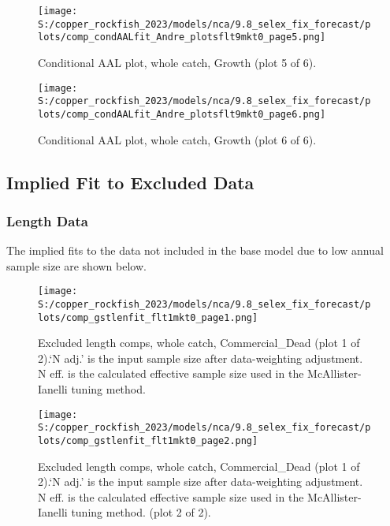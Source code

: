 \documentclass[11pt,
  english,
  letterpaper,
]{article}
\begin{document}
\begin{figure}
\centering
\texttt{[image: S:/copper\_rockfish\_2023/models/nca/9.8\_selex\_fix\_forecast/plots/comp\_condAALfit\_Andre\_plotsflt9mkt0\_page5.png]}
\caption{Conditional AAL plot, whole catch, Growth (plot 5 of 6).\label{fig:comp_condAALfit_Andre_plotsflt9mkt0_page5}}
\end{figure}

\begin{figure}
\centering
\texttt{[image: S:/copper\_rockfish\_2023/models/nca/9.8\_selex\_fix\_forecast/plots/comp\_condAALfit\_Andre\_plotsflt9mkt0\_page6.png]}
\caption{Conditional AAL plot, whole catch, Growth (plot 6 of 6).\label{fig:comp_condAALfit_Andre_plotsflt9mkt0_page6}}
\end{figure}

\hypertarget{excluded-data}{%
\subsection{Implied Fit to Excluded Data}\label{excluded-data}}

\hypertarget{length-data-1}{%
\subsubsection{Length Data}\label{length-data-1}}

The implied fits to the data not included in the base model due to low annual sample size are shown below.

\begin{figure}
\centering
\texttt{[image: S:/copper\_rockfish\_2023/models/nca/9.8\_selex\_fix\_forecast/plots/comp\_gstlenfit\_flt1mkt0\_page1.png]}
\caption{Excluded length comps, whole catch, Commercial\_Dead (plot 1 of 2).`N adj.' is the input sample size after data-weighting adjustment. N eff. is the calculated effective sample size used in the McAllister-Ianelli tuning method.\label{fig:comp_gstlenfit_flt1mkt0_page1}}
\end{figure}

\begin{figure}
\centering
\texttt{[image: S:/copper\_rockfish\_2023/models/nca/9.8\_selex\_fix\_forecast/plots/comp\_gstlenfit\_flt1mkt0\_page2.png]}
\caption{Excluded length comps, whole catch, Commercial\_Dead (plot 1 of 2).`N adj.' is the input sample size after data-weighting adjustment. N eff. is the calculated effective sample size used in the McAllister-Ianelli tuning method. (plot 2 of 2).\label{fig:comp_gstlenfit_flt1mkt0_page2}}
\end{figure}
\end{document}
